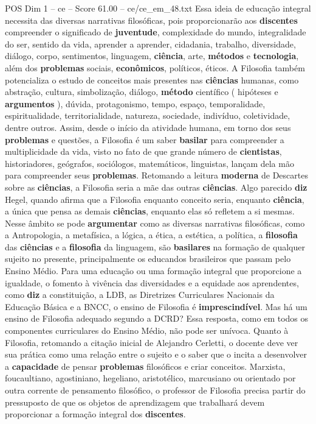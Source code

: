 \begin{textsample}{POS Dim 1 – ce – Score 61.00 – ce/ce\_em\_48.txt}
Essa ideia de educação integral necessita das diversas narrativas filosóficas, pois proporcionarão aos \textbf{discentes} compreender o significado de \textbf{juventude}, complexidade do mundo, integralidade do ser, sentido da vida, aprender a aprender, cidadania, trabalho, diversidade, diálogo, corpo, sentimentos, linguagem, \textbf{ciência}, arte, \textbf{métodos} e \textbf{tecnologia}, além dos \textbf{problemas} sociais, \textbf{econômicos}, políticos, éticos.
A Filosofia também potencializa o estudo de conceitos mais presentes nas \textbf{ciências} humanas, como abstração, cultura, simbolização, diálogo, \textbf{método} científico ( hipóteses e \textbf{argumentos} ), dúvida, protagonismo, tempo, espaço, temporalidade, espiritualidade, territorialidade, natureza, sociedade, indivíduo, coletividade, dentre outros.
Assim, desde o início da atividade humana, em torno dos seus \textbf{problemas} e questões, a Filosofia é um saber \textbf{basilar} para compreender a multiplicidade da vida, visto no fato de que grande número de \textbf{cientistas}, historiadores, geógrafos, sociólogos, matemáticos, linguistas, lançam dela mão para compreender seus \textbf{problemas}.
Retomando a leitura \textbf{moderna} de Descartes sobre as \textbf{ciências}, a Filosofia seria a mãe das outras \textbf{ciências}.
Algo parecido \textbf{diz} Hegel, quando afirma que a Filosofia enquanto conceito seria, enquanto \textbf{ciência}, a única que pensa as demais \textbf{ciências}, enquanto elas só refletem a si mesmas.
Nesse âmbito se pode \textbf{argumentar} como as diversas narrativas filosóficas, como a Antropologia, a metafísica, a lógica, a ética, a estética, a política, a \textbf{filosofia} das \textbf{ciências} e a \textbf{filosofia} da linguagem, são \textbf{basilares} na formação de qualquer sujeito no presente, principalmente os educandos brasileiros que passam pelo Ensino Médio.
Para uma educação ou uma formação integral que proporcione a igualdade, o fomento à vivência das diversidades e a equidade aos aprendentes, como \textbf{diz} a constituição, a LDB, as Diretrizes Curriculares Nacionais da Educação Básica e a BNCC, o ensino de Filosofia é \textbf{imprescindível}.
Mas há um ensino de Filosofia adequado segundo a DCRD?
Essa resposta, como em todos os componentes curriculares do Ensino Médio, não pode ser unívoca.
Quanto à Filosofia, retomando a citação inicial de Alejandro Cerletti, o docente deve ver sua prática como uma relação entre o sujeito e o saber que o incita a desenvolver a \textbf{capacidade} de pensar \textbf{problemas} filosóficos e criar conceitos.
Marxista, foucaultiano, agostiniano, hegeliano, aristotélico, marcusiano ou orientado por outra corrente de pensamento filosófico, o professor de Filosofia precisa partir do pressuposto de que os objetos de aprendizagem que trabalhará devem proporcionar a formação integral dos \textbf{discentes}.

\end{textsample}
